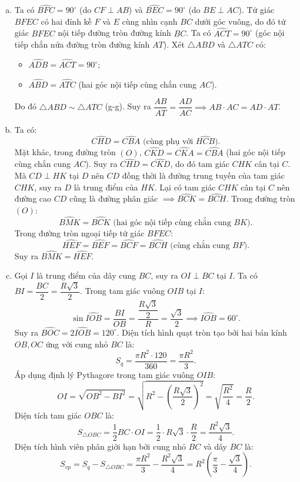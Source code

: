 \begin{bt}
{\begin{enumerate}[a)]
	\item Ta có $\widehat{BFC} = 90^\circ$ (do $CF \perp AB$) và $\widehat{BEC} = 90^\circ$ (do $BE \perp AC$).
	Tứ giác $BFEC$ có hai đỉnh kề $F$ và $E$ cùng nhìn cạnh $BC$ dưới góc vuông, do đó tứ giác $BFEC$ nội tiếp đường tròn đường kính $BC$.
	Ta có $\widehat{ACT} = 90^\circ$ (góc nội tiếp chắn nửa đường tròn đường kính $AT$).
	Xét $\triangle ABD$ và $\triangle ATC$ có:
	\begin{itemize}
		\item $\widehat{ADB} = \widehat{ACT} = 90^\circ$;
		\item $\widehat{ABD} = \widehat{ATC}$ (hai góc nội tiếp cùng chắn cung $AC$).
	\end{itemize}
	Do đó $\triangle ABD \sim \triangle ATC$ (g-g).
	Suy ra $\dfrac{AB}{AT} = \dfrac{AD}{AC} \implies AB \cdot AC = AD \cdot AT$.
	\item Ta có:
	$$\widehat{CHD} = \widehat{CBA} \text{ (cùng phụ với } \widehat{HCB}\text{)}.$$
	Mặt khác, trong đường tròn $(O)$, $\widehat{CKD} = \widehat{CKA} = \widehat{CBA}$ (hai góc nội tiếp cùng chắn cung $AC$).
	Suy ra $\widehat{CHD} = \widehat{CKD}$, do đó tam giác $CHK$ cân tại $C$.
	Mà $CD \perp HK$ tại $D$ nên $CD$ đồng thời là đường trung tuyến của tam giác $CHK$, suy ra $D$ là trung điểm của $HK$.
	Lại có tam giác $CHK$ cân tại $C$ nên đường cao $CD$ cũng là đường phân giác $\implies \widehat{BCK} = \widehat{BCH}$.
	Trong đường tròn $(O)$:
	$$\widehat{BMK} = \widehat{BCK} \text{ (hai góc nội tiếp cùng chắn cung } BK\text{)}.$$
	Trong đường tròn ngoại tiếp tứ giác $BFEC$:
	$$\widehat{HEF} = \widehat{BEF} = \widehat{BCF} = \widehat{BCH} \text{ (cùng chắn cung } BF\text{)}.$$
	Suy ra $\widehat{BMK} = \widehat{HEF}$.
	\item Gọi $I$ là trung điểm của dây cung $BC$, suy ra $OI \perp BC$ tại $I$.
	Ta có $BI = \dfrac{BC}{2} = \dfrac{R\sqrt{3}}{2}$.
	Trong tam giác vuông $OIB$ tại $I$:
	$$\sin \widehat{IOB} = \dfrac{BI}{OB} = \dfrac{\dfrac{R\sqrt{3}}{2}}{R} = \dfrac{\sqrt{3}}{2} \implies \widehat{IOB} = 60^\circ.$$
	Suy ra $\widehat{BOC} = 2\widehat{IOB} = 120^\circ$.
	Diện tích hình quạt tròn tạo bởi hai bán kính $OB, OC$ ứng với cung nhỏ $BC$ là:
	$$S_q = \dfrac{\pi R^2 \cdot 120}{360} = \dfrac{\pi R^2}{3}.$$
	Áp dụng định lý Pythagore trong tam giác vuông $OIB$:
	$$OI = \sqrt{OB^2 - BI^2} = \sqrt{R^2 - \left(\dfrac{R\sqrt{3}}{2}\right)^2} = \sqrt{\dfrac{R^2}{4}} = \dfrac{R}{2}.$$
	Diện tích tam giác $OBC$ là:
	$$S_{\triangle OBC} = \dfrac{1}{2} BC \cdot OI = \dfrac{1}{2} \cdot R\sqrt{3} \cdot \dfrac{R}{2} = \dfrac{R^2\sqrt{3}}{4}.$$
	Diện tích hình viên phân giới hạn bởi cung nhỏ $BC$ và dây $BC$ là:
	$$S_{vp} = S_q - S_{\triangle OBC} = \dfrac{\pi R^2}{3} - \dfrac{R^2\sqrt{3}}{4} = R^2\left(\dfrac{\pi}{3} - \dfrac{\sqrt{3}}{4}\right).$$
\end{enumerate}
}
\end{bt}

